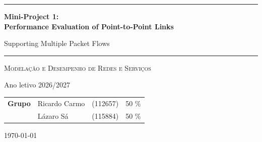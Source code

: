 \documentclass[11pt,a4paper]{article}
\begin{document}
\begin{titlepage}
    \centering

    \vspace*{1cm}

    {\color{secondaryColor}\rule{\linewidth}{2pt}\par}
    \vspace{0.6cm}

    {\huge \bfseries \color{primaryColor}
    Mini-Project 1:\\
    Performance Evaluation of Point-to-Point Links\par}

    \vspace{0.4cm}

    {\large \color{secondaryColor}
    Supporting Multiple Packet Flows\par}

    \vspace{0.2cm}

    {\color{secondaryColor}\rule{\linewidth}{2pt}\par}

    \vspace{2cm}

    {\Large \textsc{Modelação e Desempenho de Redes e Serviços}\par}

    \vspace{0.3cm}
    {\large Ano letivo 2026/2027\par}

    \vfill

    \begin{tabular}{rlll}
        \textbf{Grupo} & Ricardo Carmo   & (112657) &   50 \%\\
                       & Lázaro Sá       & (115884) &   50 \%\\
                       
    \end{tabular}

    \vspace{0.8cm}

    \vfill

    {\large \color{textColor!70} \today\par}

    \vspace*{1cm}
\end{titlepage}
\end{document}
